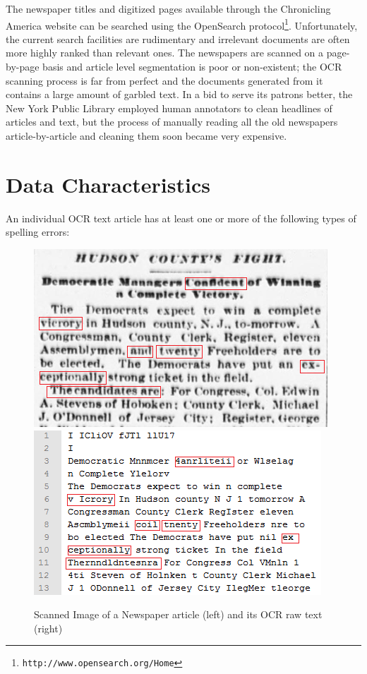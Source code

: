 \documentclass[letterpaper,11pt]{report}
\begin{document}
The newspaper titles and digitized pages available through the
Chronicling America website can be searched using the OpenSearch
protocol\footnote{\texttt{http://www.opensearch.org/Home}}.
Unfortunately, the current search facilities are rudimentary and
irrelevant documents are often more highly ranked than relevant ones.
The newspapers are scanned on a page-by-page basis and article level
segmentation is poor or non-existent; the OCR scanning process is far
from perfect and the documents generated from it contains a large
amount of garbled text. In a bid to serve its patrons better, the New
York Public Library employed human annotators to clean headlines of
articles and text, but the process of manually reading all the old
newspapers article-by-article and cleaning them soon became very
expensive. 

\section{Data Characteristics}
An individual OCR text article has at least one or more of the following types of spelling errors:

\begin{figure}[hbt]
\includegraphics[scale=0.75]{originalimage}
\includegraphics[scale=0.80]{ocr}
\caption{Scanned Image of a Newspaper article (left) and its OCR raw text (right)}
\end{figure}
\end{document}
